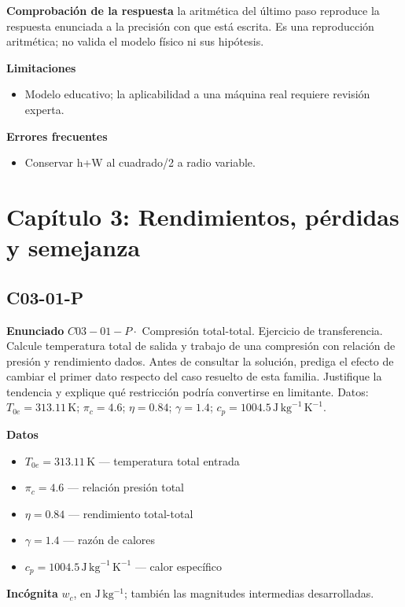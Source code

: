 \documentclass[10pt,openany]{book}
\begin{document}
\noindent\textbf{Comprobación de la respuesta} la aritmética del último paso reproduce la respuesta enunciada a la precisión con que está escrita. Es una reproducción aritmética; no valida el modelo físico ni sus hipótesis.

\noindent\textbf{Limitaciones}
\begin{itemize}
\item Modelo educativo; la aplicabilidad a una máquina real requiere revisión experta.
\end{itemize}

\noindent\textbf{Errores frecuentes}
\begin{itemize}
\item Conservar h+W al cuadrado/2 a radio variable.
\end{itemize}
\section{Capítulo 3: Rendimientos, pérdidas y semejanza}
\subsection*{C03-01-P}

\noindent\textbf{Enunciado}
\(C03-01-P \cdot\) Compresión total-total. Ejercicio de transferencia. Calcule temperatura total de salida y trabajo de una compresión con relación de presión y rendimiento dados. Antes de consultar la solución, prediga el efecto de cambiar el primer dato respecto del caso resuelto de esta familia. Justifique la tendencia y explique qué restricción podría convertirse en limitante. Datos: \(T_{0e}=313.11\, \mathrm{K}\); \(\pi_c=4.6\); \(\eta=0.84\); \(\gamma=1.4\); \(c_p=1004.5\, \mathrm{J}\,\mathrm{kg}^{-1}\,\mathrm{K}^{-1}\).

\noindent\textbf{Datos}
\begin{itemize}
\item $T_{0e} = 313.11\,\mathrm{K}$ — temperatura total entrada
\item $\pi_c = 4.6$ — relación presión total
\item $\eta = 0.84$ — rendimiento total-total
\item $\gamma = 1.4$ — razón de calores
\item $c_p = 1004.5\,\mathrm{J}\,\mathrm{kg}^{-1}\,\mathrm{K}^{-1}$ — calor específico
\end{itemize}

\noindent\textbf{Incógnita}
$w_c$, en $\mathrm{J\,kg^{-1}}$; también las magnitudes intermedias desarrolladas.
\end{document}
